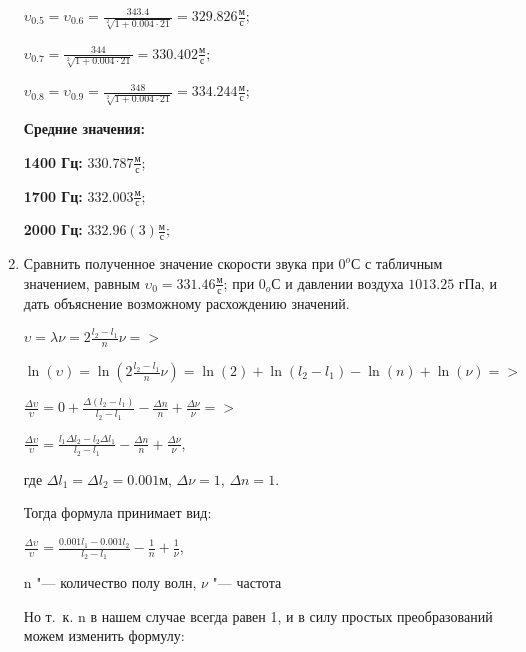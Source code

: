 \begin{enumerate}
{            $\upsilon_{0.5} = \upsilon_{0.6} = \frac{343.4}{\sqrt[2]{1 + 0.004 \cdot 21}} = 329.826 \frac{\text{м}}{\text{с}}$;

            $\upsilon_{0.7} = \frac{344}{\sqrt[2]{1 + 0.004 \cdot 21}} = 330.402 \frac{\text{м}}{\text{с}}$;

            $\upsilon_{0.8} = \upsilon_{0.9} = \frac{348}{\sqrt[2]{1 + 0.004 \cdot 21}} = 334.244 \frac{\text{м}}{\text{с}}$;

            \textbf{Средние значения:}

            \textbf{1400 Гц:} $330.787 \frac{\text{м}}{\text{с}}$;

            \textbf{1700 Гц:} $332.003 \frac{\text{м}}{\text{с}}$;

            \textbf{2000 Гц:} $332.96(3) \frac{\text{м}}{\text{с}}$;
        }
    \item{Сравнить полученное значение скорости звука при $0^o$С с табличным значением, равным $\upsilon_0 = 331.46 \frac{\text{м}}{\text{с}}$; при $0_o$С и давлении воздуха $1013.25$ гПа, и дать объяснение возможному расхождению значений.

            \begin{center}
                $\upsilon = \lambda \nu = 2 \frac{l_2 - l_1}{n} \nu =>$

                $\ln \left (\upsilon \right ) = \ln \left (2 \frac{l_2 - l_1}{n} \nu \right ) = \ln \left (2 \right ) + \ln \left (l_2 - l_1 \right ) - \ln \left (n \right ) + \ln \left (\nu \right ) =>$

                $\frac{\Delta \upsilon}{\upsilon} = 0 + \frac{\Delta \left(l_2 - l_1 \right )}{l_2 - l_1} - \frac{\Delta n}{n} + \frac{\Delta \nu}{\nu} =>$

                $\frac{\Delta \upsilon}{\upsilon} = \frac{l_1 \Delta l_2 - l_2 \Delta l_1}{l_2 - l_1} - \frac{\Delta n}{n} + \frac{\Delta \nu}{\nu}$,
            \end{center}
            где $\Delta l_1 = \Delta l_2 = 0.001 \text{м}$, $\Delta \nu = 1$, $\Delta n = 1$.

            Тогда формула принимает вид:

            $\frac{\Delta \upsilon}{\upsilon} = \frac{0.001 l_1 - 0.001 l_2}{l_2 - l_1} - \frac{1}{n} + \frac{1}{\nu}$,

            n "--- количество полу волн, $\nu$ "--- частота

            Но т. к. n в нашем случае всегда равен 1, и в силу простых преобразований можем изменить формулу:

}
\end{enumerate}
